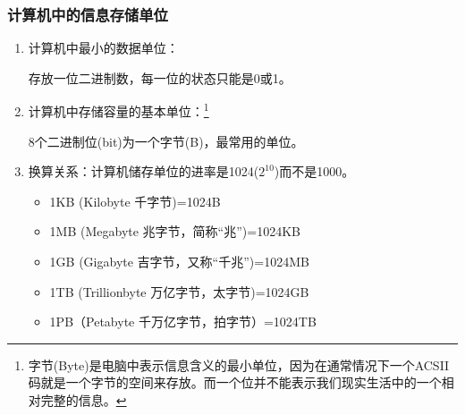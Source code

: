 \begin{frame}
    \frametitle{计算机中的信息存储单位}
    \begin{enumerate}
      \item 计算机中最小的数据单位：
      
      存放一位二进制数，每一位的状态只能是0或1。
      \item 计算机中存储容量的基本单位：\footnote{字节(Byte)是电脑中表示信息含义的最小单位，因为在通常情况下一个ACSII码就是一个字节的空间来存放。而一个位并不能表示我们现实生活中的一个相对完整的信息。}
      
      8个二进制位(bit)为一个字节(B)，最常用的单位。

      \item 换算关系：计算机储存单位的进率是1024($2^{10}$)而不是1000。
      \begin{itemize}
        \item 1KB (Kilobyte 千字节)=1024B
        \item 1MB (Megabyte 兆字节，简称“兆”)=1024KB
        \item 1GB (Gigabyte 吉字节，又称“千兆”)=1024MB
        \item 1TB (Trillionbyte 万亿字节，太字节)=1024GB
        \item 1PB（Petabyte 千万亿字节，拍字节）=1024TB
      \end{itemize}
    \end{enumerate}
\end{frame}


